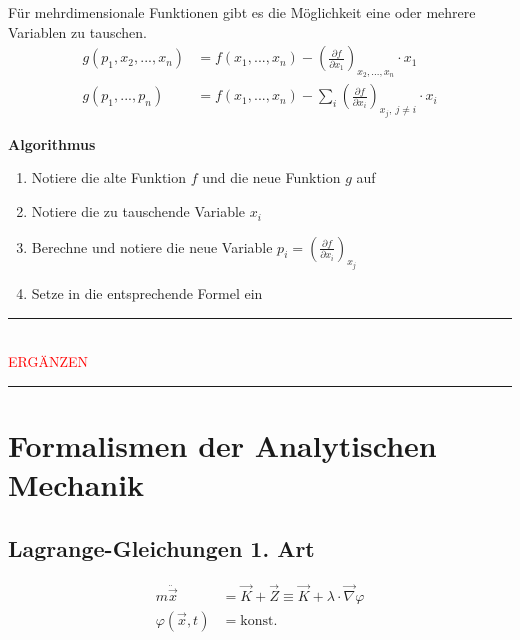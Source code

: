 \documentclass{article}
\newcommand{\lr}[1]{\left(#1\right)}
\begin{document}
Für mehrdimensionale Funktionen gibt es die Möglichkeit eine oder mehrere Variablen zu tauschen.
	\begin{align*}
		g(p_1, x_2, ..., x_n) &= f(x_1,...,x_n) - \lr{ \frac{\partial f}{\partial x_1} }_{x_2,...,x_n} \cdot x_1 \\
		g(p_1, ..., p_n) &= f(x_1,...,x_n) - \sum_{i} \lr{ \frac{\partial f}{\partial x_i} }_{x_j,\ j\neq i} \cdot x_i
	\end{align*}

\textbf{Algorithmus}
\begin{enumerate}
	\item Notiere die alte Funktion $f$ und die neue Funktion $g$ auf
	\item Notiere die zu tauschende Variable $x_i$
	\item Berechne und notiere die neue Variable $p_i = \lr{ \frac{\partial f}{\partial x_i} }_{x_j}$
	\item Setze in die entsprechende Formel ein
\end{enumerate}

\vspace{0.5cm}

{\color{blue}
\hrule
	\\
	\textcolor{red}{ERGÄNZEN}
\hrule
}


\newpage


\section{Formalismen der Analytischen Mechanik}
\subsection{Lagrange-Gleichungen 1. Art}
	\begin{align}
		m\ddot{\vec{x}} &= \vec{K} + \vec{Z} \equiv \vec{K} + \lambda \cdot \vec{\nabla}\varphi \\
		\varphi(\vec{x},t) &= \text{konst}.
	\end{align}
\end{document}
